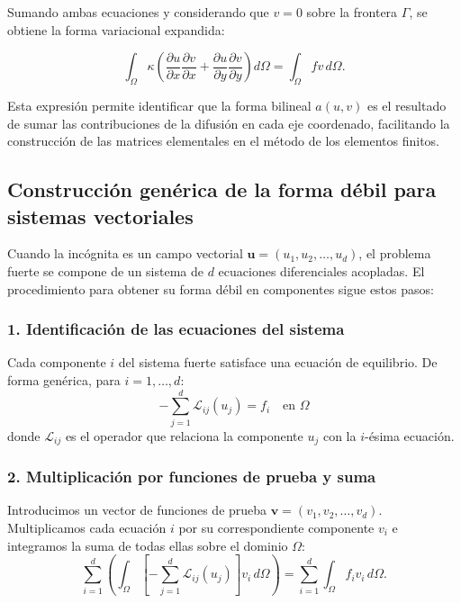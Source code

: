 \documentclass[12pt, letterpaper]{report}
\theoremstyle{definition}
\begin{document}
Sumando ambas ecuaciones y considerando que $v=0$ sobre la frontera $\Gamma$, se obtiene la forma variacional expandida:

\begin{equation}
    \int_{\Omega} \kappa \left( \frac{\partial u}{\partial x} \frac{\partial v}{\partial x} + \frac{\partial u}{\partial y} \frac{\partial v}{\partial y} \right) d\Omega = \int_{\Omega} f v \, d\Omega.
\end{equation}

Esta expresión permite identificar que la forma bilineal $a(u,v)$ es el resultado de sumar las contribuciones de la difusión en cada eje coordenado, facilitando la construcción de las matrices elementales en el método de los elementos finitos.

\subsection*{Construcción genérica de la forma débil para sistemas vectoriales}

Cuando la incógnita es un campo vectorial $\mathbf{u} = (u_1, u_2, \dots, u_d)$, el problema fuerte se compone de un sistema de $d$ ecuaciones diferenciales acopladas. El procedimiento para obtener su forma débil en componentes sigue estos pasos:

\subsubsection*{1. Identificación de las ecuaciones del sistema}
Cada componente $i$ del sistema fuerte satisface una ecuación de equilibrio. De forma genérica, para $i = 1, \dots, d$:
\begin{equation}
    -\sum_{j=1}^d \mathcal{L}_{ij}(u_j) = f_i \quad \text{en } \Omega
\end{equation}
donde $\mathcal{L}_{ij}$ es el operador que relaciona la componente $u_j$ con la $i$-ésima ecuación.

\subsubsection*{2. Multiplicación por funciones de prueba y suma}
Introducimos un vector de funciones de prueba $\mathbf{v} = (v_1, v_2, \dots, v_d)$. Multiplicamos cada ecuación $i$ por su correspondiente componente $v_i$ e integramos la suma de todas ellas sobre el dominio $\Omega$:
\begin{equation}
    \sum_{i=1}^d \left( \int_{\Omega} \left[ -\sum_{j=1}^d \mathcal{L}_{ij}(u_j) \right] v_i \, d\Omega \right) = \sum_{i=1}^d \int_{\Omega} f_i v_i \, d\Omega.
\end{equation}
\end{document}
